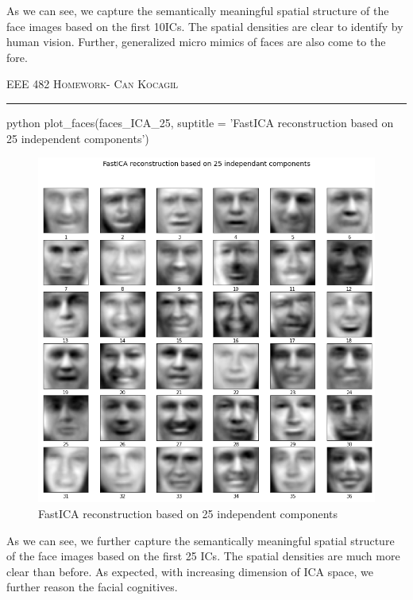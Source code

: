 \documentclass[12pt]{amsart}
\begin{document}
As we can see, we capture the semantically meaningful spatial structure of the face images based on the first 10ICs. The spatial densities are clear to identify by human vision. Further, generalized micro mimics of faces are also come to the fore.    

\newpage
{\scshape EEE 482} \hfill {\scshape \large  Homework-\relax} \hfill {\scshape Can Kocagil}
\smallskip
\hrule
\vspace{2mm}

\begin{mintedbox}{python}
plot_faces(faces_ICA_25, suptitle = 'FastICA reconstruction based on 25 independent components')
\end{mintedbox}

\begin{figure}[h]
    \centering
        \includegraphics[width = 1\textwidth]{images/Q1/FastICA reconstruction based on 25 independant components.png}
        \caption{FastICA reconstruction based on 25 independent components}
\end{figure}


As we can see, we further capture the semantically meaningful spatial structure of the face images based on the first 25 ICs. The spatial densities are much more clear than before. As expected, with increasing dimension of ICA space, we further reason the facial cognitives. 
\end{document}
